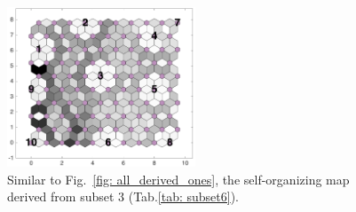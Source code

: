 \begin{figure}
        \centering
        \includegraphics[width=0.5\textwidth]{../../images0.01/M31/2D/image_subsets/subset6_dist_with_hits_t.png}
    \caption{Similar to Fig.~\ref{fig: all_derived_ones}, the self-organizing map derived from subset 3 (Tab.\ref{tab: subset6}).}
    \label{fig: subset6}
\end{figure}
